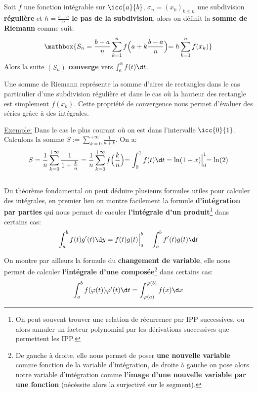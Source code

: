 \subsection*{}

Soit \(f\) une fonction intégrable sur \(\icc{a}{b}\), \(\sigma_n = (x_k)_{k \leq n}\) une subdivision \textbf{régulière} et \(h = \frac{b - a}{n}\) \textbf{le pas de la subdivision}, alors on définit la \textbf{somme de Riemann} comme suit:
\[
   \mathbox{S_n = \frac{b - a}{n} \sum_{k=1}^{n}f\Bigl(a + k\frac{b - a}{n}\Bigl) = h \sum_{k=1}^{n}f(x_k)}
\]
Alors la suite \((S_n)\) \textbf{converge} vers \(\int_{a}^{b} f(t) \d t\).\<

Une somme de Riemann représente la somme d'aires de rectangles dans le cas particulier d'une subdivision régulière et dans le cas où la hauteur des rectangle est simplement \(f(x_k)\). Cette propriété de convergence nous permet d'évaluer des séries gràce à des intégrales.\<

\underline{Exemple:} Dans le cas le plus courant où on est dans l'intervalle \(\icc{0}{1}\). Calculons la somme \(S := \sum_{k=0}^{+\infty} \frac{1}{n + k}\). On a:
\[
   S =  \frac{1}{n}\sum_{k=0}^{+\infty} \frac{1}{1 + \frac{k}{n}} = \frac{1}{n}\sum_{k=0}^{+\infty} f\Bigl(\frac{k}{n}\Bigl) = \int_{0}^{1} f(t) \d t = \ln(1 + x) \Bigl|_{0}^{1} = \ln(2)
\]

\subsection*{}

Du théorème fondamental on peut déduire plusieurs formules utiles pour calculer des intégrales, en premier lieu on montre facilement la formule \textbf{d'intégration par parties} qui nous permet de caculer \textbf{l'intégrale d'un produit}\footnote[3]{On peut souvent trouver une relation de récurrence par IPP successives, ou alors annuler un facteur polynomial par les dérivations successives que permettent les IPP.} dans certains cas:
\[
   \int_{a}^{b} f(t)g'(t) \d y = f(t)g(t) \Bigl|_{a}^{b} \; - \int_{a}^{b} f'(t)g(t) \d t
\]

On montre par ailleurs la formule du \textbf{changement de variable}, elle nous permet de calculer \textbf{l'intégrale d'une composée}\footnote[4]{De gauche à droite, elle nous permet de poser \textbf{une nouvelle variable} comme fonction de la variable d'intégration, de droite à gauche on pose alors notre variable d'intégration comme \textbf{l'image d'une nouvelle variable par une fonction} (nécéssite alors la surjectivé sur le segment).} dans certains cas:
\[
   \int_{a}^{b} f(\varphi(t))\varphi'(t) \d t = \int_{\varphi(a)}^{\varphi(b)} f(x) \d x
\]

